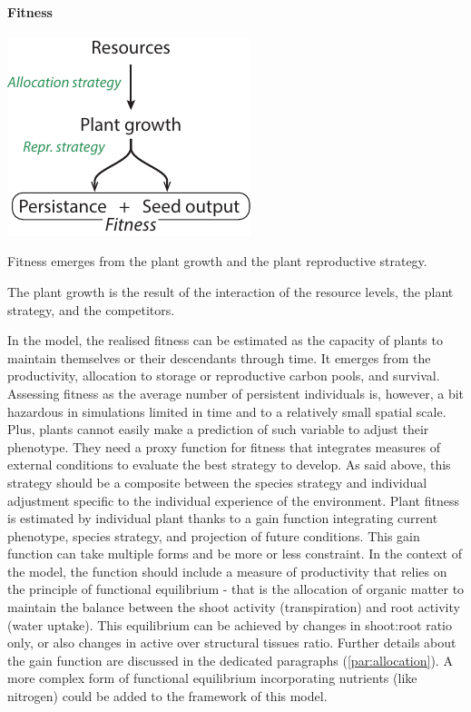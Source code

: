 \paragraph{Fitness}
\begin{marginfigure}
\includegraphics{./Figures/fitness.pdf}
\caption{Fitness emerges from the plant growth and the plant reproductive strategy.}
\begin{footnotesize}
The plant growth is the result of the interaction of the resource levels, the plant strategy, and the competitors.
\end{footnotesize}
\end{marginfigure}
In the model, the realised fitness can be estimated as the capacity of plants to maintain themselves or their descendants through time. It emerges from the productivity, allocation to storage or reproductive carbon pools, and survival. Assessing fitness as the average number of persistent individuals is, however, a bit hazardous in simulations limited in time and to a relatively small spatial scale. Plus, plants cannot easily make a prediction of such variable to adjust their phenotype. They need a proxy function for fitness that integrates measures of external conditions to evaluate the best strategy to develop. As said above, this strategy should be a composite between the species strategy and individual adjustment specific to the individual experience of the environment. Plant fitness is estimated by individual plant thanks to a gain function integrating current phenotype, species strategy, and projection of future conditions. This gain function can take multiple forms and be more or less constraint. In the context of the model, the function should include a measure of productivity that relies on the principle of functional equilibrium - that is the allocation of organic matter to maintain the balance between the shoot activity (transpiration) and root activity (water uptake). This equilibrium can be achieved by changes in shoot:root ratio only, or also changes in active over structural tissues ratio. Further details about the gain function are discussed in the dedicated paragraphs (\ref{par:allocation}). A more complex form of functional equilibrium incorporating nutrients (like nitrogen) could be added to the framework of this model.


